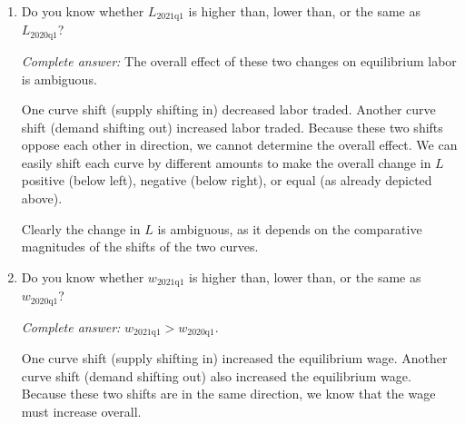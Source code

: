 \documentclass{assignment}
\begin{document}
\begin{enumerate}
\item Do you know whether $L_\text{2021q1}$ is higher than, lower than, or the same as $L_\text{2020q1}$?

\begin{solution}
\emph{Complete answer:} The overall effect of these two changes on equilibrium labor is ambiguous.

One curve shift (supply shifting in) decreased labor traded. Another curve shift (demand shifting out) increased labor traded. Because these two shifts oppose each other in direction, we cannot determine the overall effect. We can easily shift each curve by different amounts to make the overall change in $L$ positive (below left), negative (below right), or equal (as already depicted above).

\begin{center}
\vspace{-12pt}
\end{center}

Clearly the change in $L$ is ambiguous, as it depends on the comparative magnitudes of the shifts of the two curves.
\end{solution}

\item Do you know whether $w_\text{2021q1}$ is higher than, lower than, or the same as $w_\text{2020q1}$?

\begin{solution}
\emph{Complete answer:} $w_\text{2021q1} > w_\text{2020q1}$.

One curve shift (supply shifting in) increased the equilibrium wage. Another curve shift (demand shifting out) also increased the equilibrium wage. Because these two shifts are in the same direction, we know that the wage must increase overall.
\end{solution}

\end{enumerate}
\end{document}
